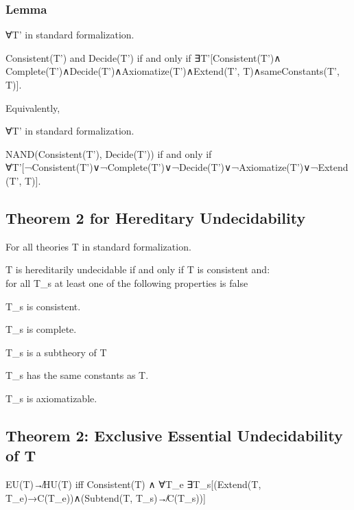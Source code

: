 \hypertarget{lemma}{%
\subsubsection{\texorpdfstring{Lemma }{Lemma }}\label{lemma}}

∀T' in standard formalization.

Consistent(T') and Decide(T') if and only if
∃T\textquotesingle'{[}Consistent(T'\textquotesingle)∧
Complete(T'\textquotesingle)∧Decide(T'\textquotesingle)∧Axiomatize(T\textquotesingle')∧Extend(T',
T\textquotesingle\textquotesingle)∧sameConstants(T',
T\textquotesingle\textquotesingle){]}.

Equivalently,

∀T' in standard formalization.

NAND(Consistent(T'), Decide(T')) if and only if
∀T\textquotesingle'{[}¬Consistent(T'\textquotesingle)∨¬Complete(T'\textquotesingle)∨¬Decide(T'\textquotesingle)∨¬Axiomatize(T\textquotesingle')∨¬Extend(T',
T\textquotesingle\textquotesingle){]}.

\hypertarget{theorem-2-for-hereditary-undecidability}{%
\subsection{Theorem 2 for Hereditary
Undecidability}\label{theorem-2-for-hereditary-undecidability}}

For all theories T in standard formalization.

T is hereditarily undecidable if and only if T is consistent and:\\
for all T\_s at least one of the following properties is false

T\_s is consistent.

T\_s is complete.

T\_s is a subtheory of T

T\_s has the same constants as T.

T\_s is axiomatizable.

\hypertarget{theorem-2-exclusive-essential-undecidability-of-t}{%
\subsection{Theorem 2: Exclusive Essential Undecidability of
T}\label{theorem-2-exclusive-essential-undecidability-of-t}}

EU(T)↛HU(T) iff Consistent(T) ∧ ∀T\_e ∃T\_s{[}(Extend(T,
T\_e)→C(T\_e))∧(Subtend(T, T\_s)↛C(T\_s)){]}

